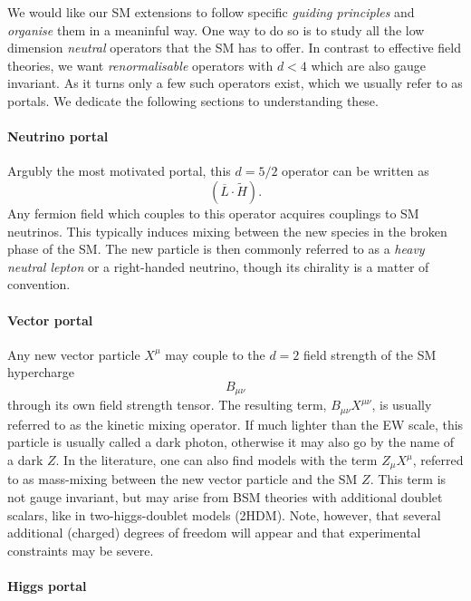 We would like our SM extensions to follow specific \emph{guiding principles} and \emph{organise} them in a meaninful way. One way to do so is to study all the low dimension \emph{neutral} operators that the SM has to offer. In contrast to effective field theories, we want \emph{renormalisable} operators with $d<4$ which are also gauge invariant. As it turns only a few such operators exist, which we usually refer to as portals. We dedicate the following sections to understanding these.

\paragraph{Neutrino portal} 

Argubly the most motivated portal, this $d=5/2$ operator can be written as
\begin{equation}
\left( \overline{L} \cdot \tilde{H}\right).
\end{equation}
Any fermion field which couples to this operator acquires couplings to SM neutrinos. This typically induces mixing between the new species in the broken phase of the SM. The new particle is then commonly referred to as a \emph{heavy neutral lepton} or a right-handed neutrino, though its chirality is a matter of convention.

\paragraph{Vector portal}

Any new vector particle $X^\mu$ may couple to the $d=2$ field strength of the SM hypercharge
\begin{equation}
B_{\mu\nu}
\end{equation}
through its own field strength tensor. The resulting term, $B_{\mu\nu} X^{\mu\nu}$, is usually referred to as the kinetic mixing operator. If much lighter than the EW scale, this particle is usually called a dark photon, otherwise it may also go by the name of a dark $Z$. In the literature, one can also find models with the term $Z_\mu X^\mu$, referred to as mass-mixing between the new vector particle and the SM $Z$. This term is not gauge invariant, but may arise from BSM theories with additional doublet scalars, like in two-higgs-doublet models (2HDM). Note, however, that several additional (charged) degrees of freedom will appear and that experimental constraints may be severe.

\paragraph{Higgs portal}

